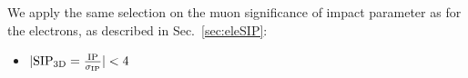 We apply the same selection on the muon significance of impact parameter as for the electrons, as described in Sec.~\ref{sec:eleSIP}:                                                                                                                                                               
%                                                                                                                                                                                                                                          
\begin{itemize}                                                                                                                                                                                                                            
\item $| {\rm SIP_{3D}} =    \frac{\rm IP}{\sigma_{\rm IP}} | < 4$                                                                                                                                                                         
\end{itemize}  
